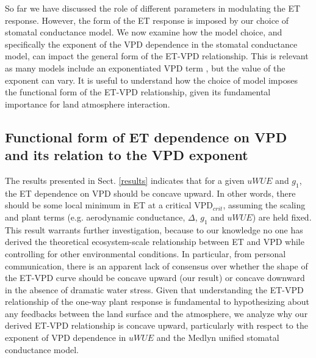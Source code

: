 So far we have discussed the role of different parameters in
modulating the ET response. However, the form of the ET response is
imposed by our choice of stomatal conductance model. We now examine
how the model choice, and specifically the exponent of the VPD
dependence in the stomatal conductance model, can impact the general
form of the ET-VPD relationship. This is relevant as many models
include an exponentiated VPD term \citep[e.g.,][]{Leuning_1990}, but
the value of the exponent can vary. It is useful to understand how the
choice of model imposes the functional form of the ET-VPD
relationship, given its fundamental importance for land atmosphere
interaction.

\subsection{Functional form of ET dependence on VPD and its relation
  to the VPD exponent}
\label{functional_form}

The results presented in Sect. \ref{results} indicates that for a
given $uWUE$ and $g_1$, the ET dependence on VPD should be concave
upward. In other words, there should be some local minimum in ET at a
critical VPD$_{crit}$, assuming the scaling and plant terms  (e.g. aerodynamic
conductance, $\Delta$, $g_1$ and $uWUE$) are held fixed. This result warrants further
investigation, because to our knowledge no one has derived the
theoretical ecosystem-scale relationship between ET and VPD while
controlling for other environmental conditions. In particular, from
personal communication, there is an apparent lack of consensus over
whether the shape of the ET-VPD curve should be concave upward (our
result) or concave downward in the absence of dramatic water stress. Given that understanding the ET-VPD
relationship of the one-way plant response is fundamental to
hypothesizing about any feedbacks between the land surface and the
atmosphere, we analyze why our derived ET-VPD relationship is concave
upward, particularly with respect to the exponent of VPD dependence in
$uWUE$ and the Medlyn unified stomatal conductance model.


